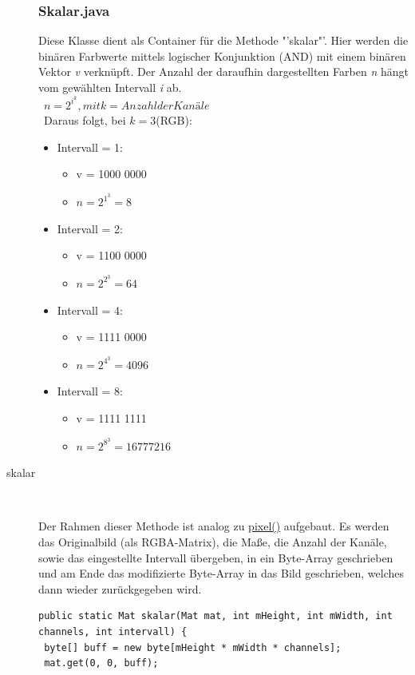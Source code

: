 \begin{description}
\subsubsection{Skalar.java}
\label{Skalar}
Diese Klasse dient als Container für die Methode "'skalar"'. Hier werden die binären Farbwerte mittels logischer Konjunktion (AND) mit einem binären Vektor \textit{v} verknüpft. Der Anzahl der daraufhin dargestellten Farben \textit{n} hängt vom gewählten Intervall \textit{i} ab.\\\ 
\( n = 2^{i^k}, mit k = Anzahl der Kanäle\) \\\
Daraus folgt, bei \(k = 3\)(RGB):
\begin{itemize}
\item Intervall = 1:  
\begin{itemize}
\item v = 1000 0000
\item \( n = 2^{1^3} =        8 \)
\end{itemize}
\item Intervall = 2:
\begin{itemize}
\item v = 1100 0000
\item \( n = 2^{2^3} =       64 \)
\end{itemize}
\item Intervall = 4:
\begin{itemize}
\item v = 1111 0000
\item \( n = 2^{4^3} =     4096 \)
\end{itemize}  
\item Intervall = 8:
\begin{itemize}
\item v = 1111 1111
\item \( n = 2^{8^3} = 16777216 \) 
\end{itemize}  
\end{itemize}
\item[skalar]~\par
\label{skalar}
Der Rahmen dieser Methode ist analog zu \hyperref[pixel]{pixel()} aufgebaut. Es werden das Originalbild (als RGBA-Matrix), die Maße, die Anzahl der Kanäle, sowie das eingestellte Intervall übergeben, in ein Byte-Array geschrieben und am Ende das modifizierte Byte-Array in das Bild geschrieben, welches dann wieder zurückgegeben wird.
\begin{lstlisting}
public static Mat skalar(Mat mat, int mHeight, int mWidth, int channels, int intervall) {
 byte[] buff = new byte[mHeight * mWidth * channels]; 
 mat.get(0, 0, buff);                                 
 

\end{lstlisting}
\end{description}
